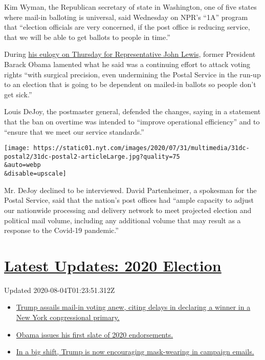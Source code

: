 Kim Wyman, the Republican secretary of state in Washington, one of five
states where mail-in balloting is universal, said Wednesday on NPR's
``1A'' program that ``election officials are very concerned, if the post
office is reducing service, that we will be able to get ballots to
people in time.''

During
\href{https://www.nytimes.com/2020/07/30/us/obama-eulogy-john-lewis-full-transcript.html}{his
eulogy on Thursday for Representative John Lewis}, former President
Barack Obama lamented what he said was a continuing effort to attack
voting rights ``with surgical precision, even undermining the Postal
Service in the run-up to an election that is going to be dependent on
mailed-in ballots so people don't get sick.''

Louis DeJoy, the postmaster general, defended the changes, saying in a
statement that the ban on overtime was intended to ``improve operational
efficiency'' and to ``ensure that we meet our service standards.''

\texttt{[image: https://static01.nyt.com/images/2020/07/31/multimedia/31dc-postal2/31dc-postal2-articleLarge.jpg?quality=75\\\&auto=webp\\\&disable=upscale]}

Mr. DeJoy declined to be interviewed. David Partenheimer, a spokesman
for the Postal Service, said that the nation's post offices had ``ample
capacity to adjust our nationwide processing and delivery network to
meet projected election and political mail volume, including any
additional volume that may result as a response to the Covid-19
pandemic.''

\hypertarget{latest-updates-2020-election}{%
\section{\texorpdfstring{\href{https://www.nytimes.com/2020/08/03/us/elections/biden-vs-trump.html?action=click\&pgtype=Article\&state=default\&region=MAIN_CONTENT_1\&context=storylines_live_updates}{Latest
Updates: 2020
Election}}{Latest Updates: 2020 Election}}\label{latest-updates-2020-election}}

Updated 2020-08-04T01:23:51.312Z

\begin{itemize}
\tightlist
\item
  \href{https://www.nytimes.com/2020/08/03/us/elections/biden-vs-trump.html?action=click\&pgtype=Article\&state=default\&region=MAIN_CONTENT_1\&context=storylines_live_updates\#link-6494b448}{Trump
  assails mail-in voting anew, citing delays in declaring a winner in a
  New York congressional primary.}
\item
  \href{https://www.nytimes.com/2020/08/03/us/elections/biden-vs-trump.html?action=click\&pgtype=Article\&state=default\&region=MAIN_CONTENT_1\&context=storylines_live_updates\#link-3de249e6}{Obama
  issues his first slate of 2020 endorsements.}
\item
  \href{https://www.nytimes.com/2020/08/03/us/elections/biden-vs-trump.html?action=click\&pgtype=Article\&state=default\&region=MAIN_CONTENT_1\&context=storylines_live_updates\#link-54e34d20}{In
  a big shift, Trump is now encouraging mask-wearing in campaign
  emails.}
\end{itemize}

